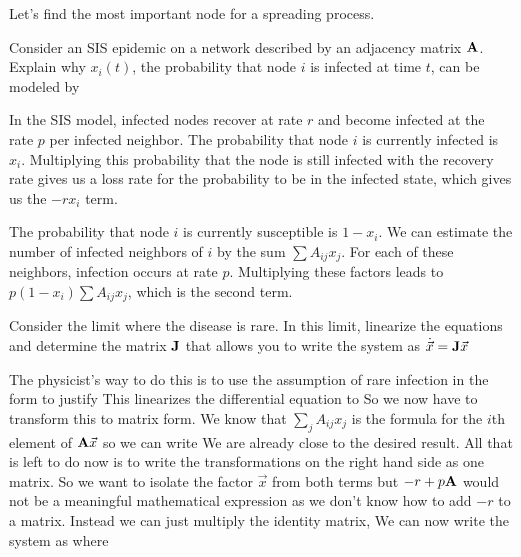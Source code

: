 Let's find the most important node for a spreading process.

\subquestion Consider an SIS epidemic on a network described by an adjacency matrix $\bf A$. Explain why $x_i(t)$, the probability that node $i$ is infected at time $t$, can be modeled by 

\solution
In the SIS model, infected nodes recover at rate $r$ and become infected at the rate $p$ per infected neighbor. The probability that node $i$ is currently infected is $x_i$. Multiplying this probability that the node is still infected with the recovery rate gives us a loss rate for the probability to be in the infected state, which gives us the $-rx_i$ term.

The probability that node $i$ is currently susceptible is $1-x_i$. We can estimate the number of infected neighbors of $i$ by the sum $\sum A_{ij} x_j$. For each of these neighbors, infection occurs at rate $p$. Multiplying these factors leads to $p(1-x_i)\sum A_{ij}x_j$, which is the second term. 

\subquestion
Consider the limit where the disease is rare. In this limit, linearize the equations and determine the matrix $\bf J$ that allows you to write the system as $\dot{\vec{x}}={\bf J}\vec{x}$ 

\solution
The physicist's way to do this is to use the assumption of rare infection in the form  
to justify
This linearizes the differential equation to
So we now have to transform this to matrix form. We know that $\sum_j A_{ij} x_j$ is the formula for the $i$th element of ${\bf A}\vec{x}$ so we can write 
We are already close to the desired result. All that is left to do now is to write the transformations on the right hand side as one matrix. So we want to isolate the factor $\vec{x}$ from both terms but $-r+p{\bf A}$ would not be a meaningful mathematical expression as we don't know how to add $-r$ to a matrix. Instead we can just multiply the identity matrix, 
We can now write the system as 
where 

